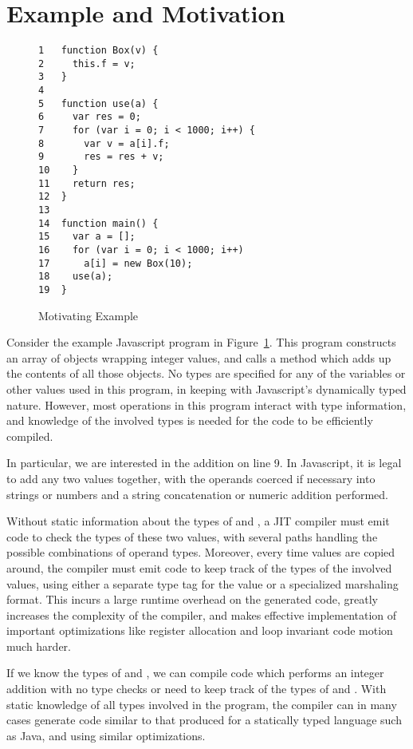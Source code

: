 
\section{Example and Motivation}
\label{sec:example}

\begin{figure}
\begin{lstlisting}
1   function Box(v) {
2     this.f = v;
3   }
4
5   function use(a) {
6     var res = 0;
7     for (var i = 0; i < 1000; i++) {
8       var v = a[i].f;
9       res = res + v;
10    }
11    return res;
12  }
13
14  function main() {
15    var a = [];
16    for (var i = 0; i < 1000; i++)
17      a[i] = new Box(10);
18    use(a);
19  }
\end{lstlisting}
\caption{Motivating Example}
\label{fig:motivating-example}
\end{figure}

Consider the example Javascript program in Figure~\ref{fig:motivating-example}.
This program constructs an array of  objects wrapping integer
values, and calls a  method which adds up the contents of all
those  objects.
No types are specified for any of the variables or other values used
in this program, in keeping with Javascript's dynamically typed nature.
However, most operations in this program interact with type information,
and knowledge of the involved types is needed for the code to
be efficiently compiled.

In particular, we are interested in the addition
 on line 9.
In Javascript, it is legal to add any two values together, with the
operands coerced if necessary into strings or numbers and a string
concatenation or numeric addition performed.

Without static information about the types of  and ,
a JIT compiler must emit code to check the types of these two values,
with several paths handling the possible combinations of
operand types.
Moreover, every time values are copied around, the compiler must emit
code to keep track of the types of the involved values, using either
a separate type tag for the value or a specialized marshaling format.
This incurs a large runtime overhead on the generated code,
greatly increases the complexity of the compiler,
and makes effective implementation of important optimizations like
register allocation and loop invariant code motion much harder.

If we know the types of  and , we can compile
code which performs an integer addition with no type checks or need
to keep track of the types of  and .
With static knowledge of all types involved in the program, the compiler can
in many cases generate code similar to that produced for a statically
typed language such as Java, and using similar optimizations.

